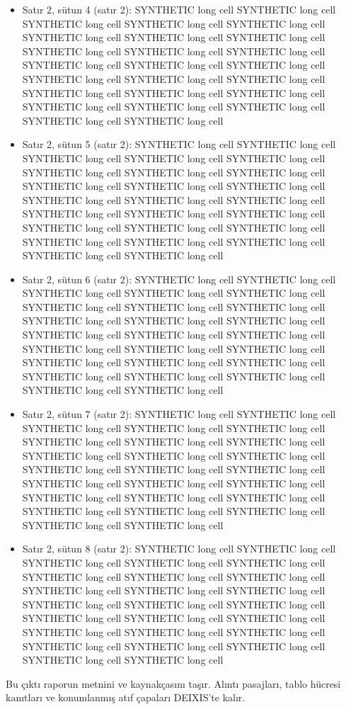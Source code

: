 \documentclass[journal]{IEEEtran}
\begin{document}
\begin{itemize}
\item[15.] Satır 2, sütun 4 (satır 2): SYNTHETIC long cell SYNTHETIC long cell SYNTHETIC long cell SYNTHETIC long cell SYNTHETIC long cell SYNTHETIC long cell SYNTHETIC long cell SYNTHETIC long cell SYNTHETIC long cell SYNTHETIC long cell SYNTHETIC long cell SYNTHETIC long cell SYNTHETIC long cell SYNTHETIC long cell SYNTHETIC long cell SYNTHETIC long cell SYNTHETIC long cell SYNTHETIC long cell SYNTHETIC long cell SYNTHETIC long cell SYNTHETIC long cell SYNTHETIC long cell SYNTHETIC long cell SYNTHETIC long cell SYNTHETIC long cell
\item[16.] Satır 2, sütun 5 (satır 2): SYNTHETIC long cell SYNTHETIC long cell SYNTHETIC long cell SYNTHETIC long cell SYNTHETIC long cell SYNTHETIC long cell SYNTHETIC long cell SYNTHETIC long cell SYNTHETIC long cell SYNTHETIC long cell SYNTHETIC long cell SYNTHETIC long cell SYNTHETIC long cell SYNTHETIC long cell SYNTHETIC long cell SYNTHETIC long cell SYNTHETIC long cell SYNTHETIC long cell SYNTHETIC long cell SYNTHETIC long cell SYNTHETIC long cell SYNTHETIC long cell SYNTHETIC long cell SYNTHETIC long cell SYNTHETIC long cell
\item[17.] Satır 2, sütun 6 (satır 2): SYNTHETIC long cell SYNTHETIC long cell SYNTHETIC long cell SYNTHETIC long cell SYNTHETIC long cell SYNTHETIC long cell SYNTHETIC long cell SYNTHETIC long cell SYNTHETIC long cell SYNTHETIC long cell SYNTHETIC long cell SYNTHETIC long cell SYNTHETIC long cell SYNTHETIC long cell SYNTHETIC long cell SYNTHETIC long cell SYNTHETIC long cell SYNTHETIC long cell SYNTHETIC long cell SYNTHETIC long cell SYNTHETIC long cell SYNTHETIC long cell SYNTHETIC long cell SYNTHETIC long cell SYNTHETIC long cell
\item[18.] Satır 2, sütun 7 (satır 2): SYNTHETIC long cell SYNTHETIC long cell SYNTHETIC long cell SYNTHETIC long cell SYNTHETIC long cell SYNTHETIC long cell SYNTHETIC long cell SYNTHETIC long cell SYNTHETIC long cell SYNTHETIC long cell SYNTHETIC long cell SYNTHETIC long cell SYNTHETIC long cell SYNTHETIC long cell SYNTHETIC long cell SYNTHETIC long cell SYNTHETIC long cell SYNTHETIC long cell SYNTHETIC long cell SYNTHETIC long cell SYNTHETIC long cell SYNTHETIC long cell SYNTHETIC long cell SYNTHETIC long cell SYNTHETIC long cell
\item[19.] Satır 2, sütun 8 (satır 2): SYNTHETIC long cell SYNTHETIC long cell SYNTHETIC long cell SYNTHETIC long cell SYNTHETIC long cell SYNTHETIC long cell SYNTHETIC long cell SYNTHETIC long cell SYNTHETIC long cell SYNTHETIC long cell SYNTHETIC long cell SYNTHETIC long cell SYNTHETIC long cell SYNTHETIC long cell SYNTHETIC long cell SYNTHETIC long cell SYNTHETIC long cell SYNTHETIC long cell SYNTHETIC long cell SYNTHETIC long cell SYNTHETIC long cell SYNTHETIC long cell SYNTHETIC long cell SYNTHETIC long cell SYNTHETIC long cell
\end{itemize}

Bu çıktı raporun metnini ve kaynakçasını taşır. Alıntı pasajları, tablo hücresi kanıtları ve konumlanmış atıf çapaları DEIXIS'te kalır.




\end{document}
